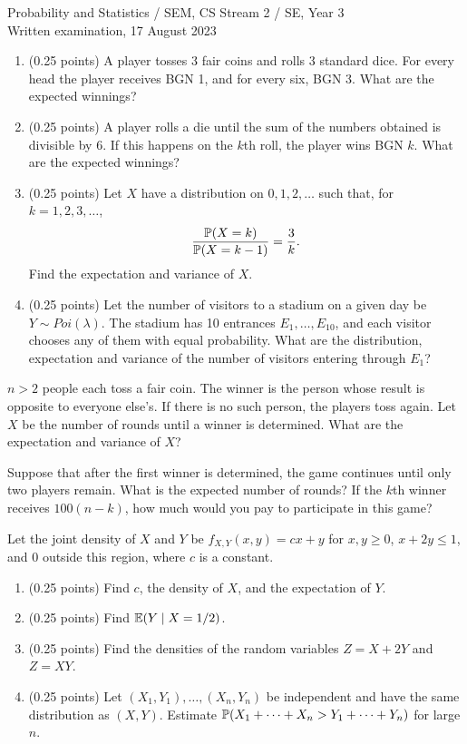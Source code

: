 \documentclass[a4paper]{report}
\begin{document}
\noindent Probability and Statistics / SEM, CS Stream 2 / SE, Year 3\\
Written examination, 17 August 2023
\hrulefill
\begin{problem}
\begin{enumerate}
\item (0.25 points) A player tosses 3 fair coins and rolls 3 standard dice. For every head the player receives BGN 1, and for every six, BGN 3. What are the expected winnings?
\item (0.25 points) A player rolls a die until the sum of the numbers obtained is divisible by 6. If this happens on the $k$th roll, the player wins BGN $k$. What are the expected winnings?
\item (0.25 points) Let $X$ have a distribution on $0,1,2,\dots$ such that, for $k=1,2,3,\dots$,
\[\frac{\P(X=k)}{\P(X=k-1)}=\frac{3}{k}.\]
Find the expectation and variance of $X$.
\item (0.25 points) Let the number of visitors to a stadium on a given day be $Y\sim Poi(\lambda)$. The stadium has 10 entrances $E_1,\dots,E_{10}$, and each visitor chooses any of them with equal probability. What are the distribution, expectation and variance of the number of visitors entering through $E_1$?
\end{enumerate}
\end{problem}
\begin{problem}
$n>2$ people each toss a fair coin. The winner is the person whose result is opposite to everyone else's. If there is no such person, the players toss again. Let $X$ be the number of rounds until a winner is determined. What are the expectation and variance of $X$?

Suppose that after the first winner is determined, the game continues until only two players remain. What is the expected number of rounds? If the $k$th winner receives $100(n-k)$, how much would you pay to participate in this game?
\end{problem}
\begin{problem}
Let the joint density of $X$ and $Y$ be $f_{X,Y}(x,y)=cx+y$ for $x,y\geq0$, $x+2y\leq1$, and 0 outside this region, where $c$ is a constant.
\begin{enumerate}
\item (0.25 points) Find $c$, the density of $X$, and the expectation of $Y$.
\item (0.25 points) Find $\E(Y\mid X=1/2)$.
\item (0.25 points) Find the densities of the random variables $Z=X+2Y$ and $Z=XY$.
\item (0.25 points) Let $(X_1,Y_1),\dots,(X_n,Y_n)$ be independent and have the same distribution as $(X,Y)$. Estimate $\P(X_1+\dots+X_n>Y_1+\dots+Y_n)$ for large $n$.
\end{enumerate}
\end{problem}
\end{document}
